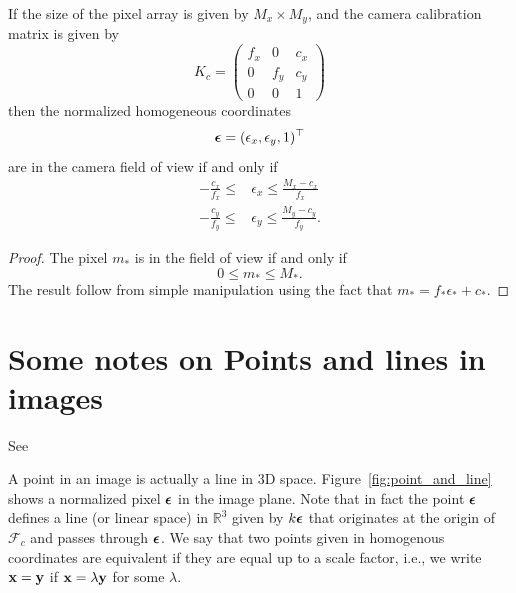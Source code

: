 \begin{lemma}
	If the size of the pixel array is given by $M_x \times M_y$, and the camera calibration matrix is given by
	\[
	K_c = \begin{pmatrix} f_x & 0 & c_x \\ 0 & f_y & c_y \\ 0 & 0 & 1 \end{pmatrix}
	\]
	then the normalized homogeneous coordinates
	\[
	\boldsymbol{\epsilon} = (\epsilon_x, \epsilon_y, 1)^\top
	\]
	 are in the camera field of view if and only if
	\begin{align*}
	-\frac{c_x}{f_x} \leq &\epsilon_x \leq \frac{M_x - c_x}{f_x} \\
	-\frac{c_y}{f_y} \leq &\epsilon_y \leq \frac{M_y - c_y}{f_y}.
	\end{align*}
\end{lemma}
\begin{proof}
	The pixel $m_\ast$ is in the field of view if and only if
	\[
	0 \leq m_\ast \leq M_\ast.
	\]
	The result follow from simple manipulation using the fact that
	$m_\ast = f_\ast \epsilon_\ast + c_\ast$.
\end{proof}


\section{Some notes on Points and lines in images}
See~\cite{MaSoattoKoseckaSastry03} 

A point in an image is actually a line in 3D space.  Figure~\ref{fig:point_and_line} shows a normalized pixel $\boldsymbol{\epsilon}$ 
in the image plane.  Note that in fact the point $\boldsymbol{\epsilon}$ defines a line (or linear space) in $\mathbb{R}^3$ given by $k\boldsymbol{\epsilon}$ that originates at the origin of $\mathcal{F}_c$ and passes through $\boldsymbol{\epsilon}$.  We say that two points given in homogenous coordinates are equivalent if they are equal up to a scale factor, i.e., we write $\mathbf{x} = \mathbf{y}$ if $\mathbf{x} = \lambda \mathbf{y}$ for some $\lambda$.  

